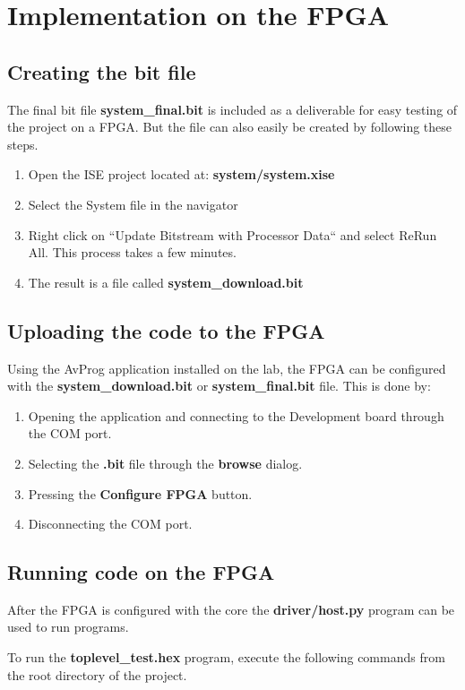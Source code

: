 \section{Implementation on the FPGA}

\subsection{Creating the bit file}
The final bit file {\bf system\_final.bit} is included as a deliverable for easy testing of the project on a FPGA. But the file can also easily be created by following these steps.


\begin{enumerate}
	\item Open the ISE project located at:
		{\bf system/system.xise}
	\item Select the System file in the navigator
  \item Right click on ``Update Bitstream with Processor Data`` and select ReRun All. This process takes a few minutes. 
	\item The result is a file called {\bf system\_download.bit}
\end{enumerate}


\subsection{Uploading the code to the FPGA}
Using the AvProg application installed on the lab, the FPGA can be configured with the {\bf system\_download.bit} or {\bf system\_final.bit} file.
This is done by:

\begin{enumerate}
\item Opening the application and connecting to the Development board through the COM port.
\item Selecting the {\bf .bit} file through the {\bf browse} dialog. 
\item Pressing the {\bf Configure FPGA} button.
\item Disconnecting the COM port. 
\end{enumerate}  

\subsection{Running code on the FPGA}
After the FPGA is configured with the core the {\bf driver/host.py} program can be used to run programs.

To run the {\bf toplevel\_test.hex} program, execute the following commands from the root directory of the project.

